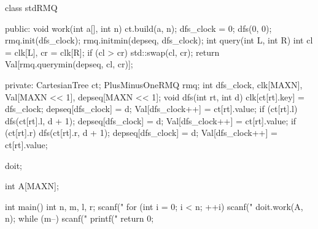 \begin{cppcode}
class stdRMQ {
 public:
  void work(int a[], int n) {
    ct.build(a, n);
    dfs_clock = 0;
    dfs(0, 0);
    rmq.init(dfs_clock);
    rmq.initmin(depseq, dfs_clock);
  }
  int query(int L, int R) {
    int cl = clk[L], cr = clk[R];
    if (cl > cr) {
      std::swap(cl, cr);
    }
    return Val[rmq.querymin(depseq, cl, cr)];
  }

 private:
  CartesianTree ct;
  PlusMinusOneRMQ rmq;
  int dfs_clock, clk[MAXN], Val[MAXN << 1], depseq[MAXN << 1];
  void dfs(int rt, int d) {
    clk[ct[rt].key] = dfs_clock;
    depseq[dfs_clock] = d;
    Val[dfs_clock++] = ct[rt].value;
    if (ct[rt].l) {
      dfs(ct[rt].l, d + 1);
      depseq[dfs_clock] = d;
      Val[dfs_clock++] = ct[rt].value;
    }
    if (ct[rt].r) {
      dfs(ct[rt].r, d + 1);
      depseq[dfs_clock] = d;
      Val[dfs_clock++] = ct[rt].value;
    }
  }
} doit;

int A[MAXN];

int main() {
  int n, m, l, r;
  scanf("%
  for (int i = 0; i < n; ++i) {
    scanf("%
  }
  doit.work(A, n);
  while (m--) {
    scanf("%
    printf("%
  }
  return 0;
}
\end{cppcode}
